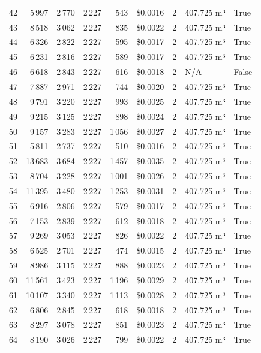 \documentclass[a4paper,11pt]{article}
\begin{document}
\begin{table}[ht]
\begin{tabular}{r r r r r r r p{3cm} l}
42 & 5\,997 & 2\,770 & 2\,227 & 543 & \$0.0016 & 2 & 407.725 m³ & True \\
43 & 8\,518 & 3\,062 & 2\,227 & 835 & \$0.0022 & 2 & 407.725 m³ & True \\
44 & 6\,326 & 2\,822 & 2\,227 & 595 & \$0.0017 & 2 & 407.725 m³ & True \\
45 & 6\,231 & 2\,816 & 2\,227 & 589 & \$0.0017 & 2 & 407.725 m³ & True \\
46 & 6\,618 & 2\,843 & 2\,227 & 616 & \$0.0018 & 2 & N/A & False \\
47 & 7\,887 & 2\,971 & 2\,227 & 744 & \$0.0020 & 2 & 407.725 m³ & True \\
48 & 9\,791 & 3\,220 & 2\,227 & 993 & \$0.0025 & 2 & 407.725 m³ & True \\
49 & 9\,215 & 3\,125 & 2\,227 & 898 & \$0.0024 & 2 & 407.725 m³ & True \\
50 & 9\,157 & 3\,283 & 2\,227 & 1\,056 & \$0.0027 & 2 & 407.725 m³ & True \\
51 & 5\,811 & 2\,737 & 2\,227 & 510 & \$0.0016 & 2 & 407.725 m³ & True \\
52 & 13\,683 & 3\,684 & 2\,227 & 1\,457 & \$0.0035 & 2 & 407.725 m³ & True \\
53 & 8\,704 & 3\,228 & 2\,227 & 1\,001 & \$0.0026 & 2 & 407.725 m³ & True \\
54 & 11\,395 & 3\,480 & 2\,227 & 1\,253 & \$0.0031 & 2 & 407.725 m³ & True \\
55 & 6\,916 & 2\,806 & 2\,227 & 579 & \$0.0017 & 2 & 407.725 m³ & True \\
56 & 7\,153 & 2\,839 & 2\,227 & 612 & \$0.0018 & 2 & 407.725 m³ & True \\
57 & 9\,269 & 3\,053 & 2\,227 & 826 & \$0.0022 & 2 & 407.725 m³ & True \\
58 & 6\,525 & 2\,701 & 2\,227 & 474 & \$0.0015 & 2 & 407.725 m³ & True \\
59 & 8\,986 & 3\,115 & 2\,227 & 888 & \$0.0023 & 2 & 407.725 m³ & True \\
60 & 11\,561 & 3\,423 & 2\,227 & 1\,196 & \$0.0029 & 2 & 407.725 m³ & True \\
61 & 10\,107 & 3\,340 & 2\,227 & 1\,113 & \$0.0028 & 2 & 407.725 m³ & True \\
62 & 6\,806 & 2\,845 & 2\,227 & 618 & \$0.0018 & 2 & 407.725 m³ & True \\
63 & 8\,297 & 3\,078 & 2\,227 & 851 & \$0.0023 & 2 & 407.725 m³ & True \\
64 & 8\,190 & 3\,026 & 2\,227 & 799 & \$0.0022 & 2 & 407.725 m³ & True \\

\end{tabular}
\end{table}
\end{document}
